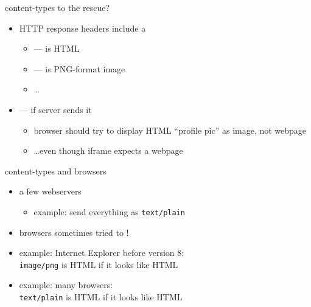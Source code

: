 \begin{frame}{content-types to the rescue?}
    \begin{itemize}
        \item HTTP response headers include a 
        \begin{itemize}
            \item {} --- is HTML
            \item {} --- is PNG-format image
        \item \ldots
        \end{itemize}
    \item {} --- if server sends it
        \begin{itemize}
        \item browser should try to display HTML ``profile pic'' as image, not webpage
        \item \ldots even though iframe expects a webpage
        \end{itemize}
    \end{itemize}
\end{frame}

\begin{frame}{content-types and browsers}
    \begin{itemize}
    \item a few webservers 
        \begin{itemize}
            \item example: send everything as \texttt{text/plain}
        \end{itemize}
    \item browsers sometimes tried to !
    \item example: Internet Explorer before version 8: \\
        \texttt{image/png} is HTML if it looks like HTML
    \item example: many browsers: \\
        \texttt{text/plain} is HTML if it looks like HTML
    \end{itemize}
\end{frame}




